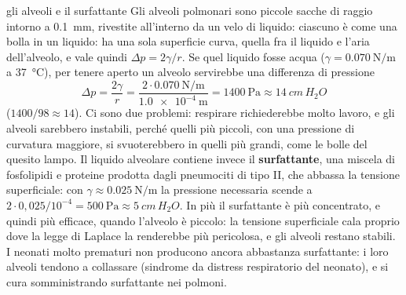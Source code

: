 

\begin{applicazione}{gli alveoli e il surfattante}
Gli alveoli polmonari sono piccole sacche di raggio intorno a \SI{0,1}{\milli\metre}, rivestite all'interno da un velo di liquido: ciascuno è come una bolla in un liquido: ha una sola superficie curva, quella fra il liquido e l'aria dell'alveolo, e vale quindi $\Delta p = 2\gamma/r$. Se quel liquido fosse acqua ($\gamma = \SI{0,070}{\newton\per\metre}$ a \SI{37}{\celsius}), per tenere aperto un alveolo servirebbe una differenza di pressione
\[
  \Delta p = \frac{2\gamma}{r} = \frac{2 \cdot \SI{0,070}{\newton\per\metre}}{\SI{1,0e-4}{\metre}} = \SI{1400}{\pascal} \approx \SI{14}{cm\,H_2O}
\]
($1400/98 \approx 14$). Ci sono due problemi: respirare richiederebbe molto lavoro, e gli alveoli sarebbero instabili, perché quelli più piccoli, con una pressione di curvatura maggiore, si svuoterebbero in quelli più grandi, come le bolle del quesito lampo. Il liquido alveolare contiene invece il \textbf{surfattante}, una miscela di fosfolipidi e proteine prodotta dagli pneumociti di tipo II, che abbassa la tensione superficiale: con $\gamma \approx \SI{0,025}{\newton\per\metre}$ la pressione necessaria scende a $2 \cdot 0{,}025/10^{-4} = \SI{500}{\pascal} \approx \SI{5}{cm\,H_2O}$. In più il surfattante è più concentrato, e quindi più efficace, quando l'alveolo è piccolo: la tensione superficiale cala proprio dove la legge di Laplace la renderebbe più pericolosa, e gli alveoli restano stabili. I neonati molto prematuri non producono ancora abbastanza surfattante: i loro alveoli tendono a collassare (sindrome da distress respiratorio del neonato), e si cura somministrando surfattante nei polmoni.
\end{applicazione}

